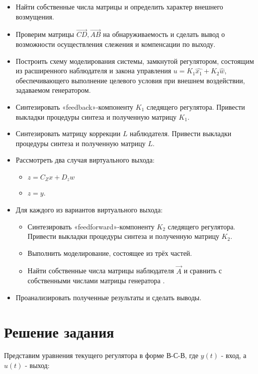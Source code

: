\begin{itemize}
  \item Найти собственные числа матрицы  и определить характер внешнего возмущения.
  \item Проверим матрицы $\vec{CD}, \vec{AB}$  на обнаруживаемость и сделать вывод о возможности
  осуществления слежения и компенсации по выходу.
  \item Построить схему моделирования системы, замкнутой регулятором, состоящим
  из расширенного наблюдателя и закона управления $u = K_1 \hat{x_1} + K_2 \hat{w}$,  обеспечивающего выполнение целевого условия при внешнем воздействии, 
  задаваемом генератором.
  \item Синтезировать «feedback»-компоненту $K_1$ следящего регулятора. Привести выкладки процедуры синтеза и
  полученную матрицу $K_1$.
  \item Синтезировать матрицу коррекции $L$ наблюдателя. Привести выкладки процедуры
  синтеза и полученную матрицу $L$. 
  \item Рассмотреть два случая виртуального выхода:
  \begin{itemize}
    \item $z = C_Z x + D_z w$
    \item $z = y $.
  \end{itemize}
  \item   Для каждого из вариантов виртуального выхода:
  \begin{itemize}
    \item Синтезировать «feedforward»-компоненту $K_2$ следящего регулятора. Привести выкладки процедуры синтеза и полученную матрицу $K_2$.
    \item Выполнить моделирование, состоящее из трёх частей.
    \item Найти собственные числа матрицы наблюдателя $\vec{A}$ и сравнить с 
    собственными числами матрицы генератора .
    
  \end{itemize}
  \item  Проанализировать полученные результаты и сделать выводы.
\end{itemize}

\section{Решение задания}

Представим уравнения текущего регулятора в форме $\text{В-С-В}$, где $y(t)$ - вход, а $u(t)$ - выход:


